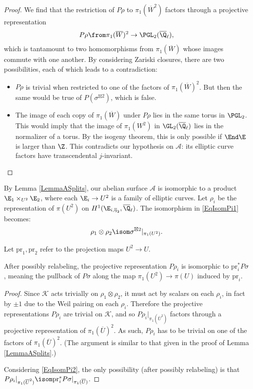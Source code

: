 \documentclass{article}
\newcommand{\adam}[1]{\textcolor{blue}{#1}}
\begin{document}
\begin{proof}
We find that the restriction of $P\rho$ to $\pi_1(\overline{W}^2)$ factors through a projective representation 
\[ P\rho\from \pi_1(\overline{W})^2\to \PGL_2(\overline{\Q}_\ell),\]
which is tantamount to two homomorphisms from $\pi_1(\overline{W})$ whose images commute with one another. %
By considering Zariski closures, there are two possibilities, each of which leads to a contradiction:
\begin{itemize}
    \item $P\rho$ is trivial when restricted to one of the factors of $\pi_1(\overline{W})^2$. But then the same would be true of $P(\sigma^{\boxtimes 2})$, which is false.
\item The image of each copy of $\pi_1(\overline{W})$ under $P\rho$ lies in the same torus in $\PGL_2$.  This would imply that the image of $\pi_1(W^2)$ in $\GL_2(\overline{\Q}_\ell)$ lies in the normalizer of a torus.  By the isogeny theorem, this is only possible if $\End\E$ is larger than $\Z$.  This contradicts our hypothesis on $\mathcal{A}$:  its elliptic curve factors have transcendental $j$-invariant.  
\end{itemize}
\end{proof}

By Lemma \ref{LemmaASplits}, our abelian surface $\mathcal{A}$ is isomorphic to a product $\E_1\times_{U^2} \E_2$, where each $\E_i\to U^2$ is a family of elliptic curves.  Let $\rho_i$ be the representation of $\pi(U^2)$ on 
 $H^1(\E_{i,\overline{\eta}_2},\overline{\Q}_\ell)$.  The isomorphism in \eqref{EqIsomPi1} becomes:
 \begin{equation}
     \label{EqIsomPi2}
 \rho_1\otimes \rho_2\isom \sigma^{\boxtimes 2}\vert_{\pi_1(U^2)}.
  \end{equation}

Let $\text{pr}_1,\text{pr}_2$ refer to the projection maps $U^2\to U$.  


\begin{lemma} \label{LemmaProjectiveRep}
After possibly relabeling, the projective representation $P\rho_i$ is isomorphic to $\text{pr}_i^*P\sigma$, meaning the pullback of $P\sigma$ along the map $\pi_1(U^2)\to \pi(U)$ induced by $\text{pr}_i$.  
\end{lemma}

\begin{proof}
Since $\mathcal{K}$ acts trivially on $\rho_1\otimes \rho_2$, it must act by scalars on each $\rho_i$, in fact by $\pm 1$ due to the Weil pairing on each $\rho_i$.  
Therefore the projective representations $P\rho_i$ are trivial on $\mathcal{K}$, and so $P\rho_i\vert_{\pi_1(\overline{U}^2)}$ factors through a projective representation of $\pi_1(\overline{U})^2$.  As such, $P\rho_i$ has to be trivial on one of the factors of $\pi_1(\overline{U})^2$.  (The argument is similar to that  given in the proof of Lemma \ref{LemmaASplits}.) 

Considering \eqref{EqIsomPi2}, the only possibility (after possibly relabeling) is that $P\rho_i\vert_{\pi_1(\overline{U}^2)}\isom \text{pr}_i^*P\sigma\vert_{\pi_1(\overline{U})}$. 
\end{proof}
\end{document}

